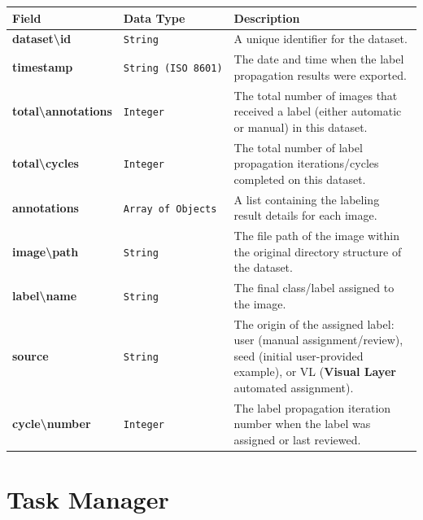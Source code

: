 \documentclass[
  11pt,
  a4paper,
  11pt,
  oneside]{report}
\renewcommand{\toprule}{\hline}
\renewcommand{\midrule}{\hline}
\renewcommand{\bottomrule}{\hline}
\begin{document}
\begin{longtable}[]{@{}
  >{\raggedright\arraybackslash}p{}
  >{\raggedright\arraybackslash}p{}
  >{\raggedright\arraybackslash}p{}@{}}
\toprule\noalign{}
\begin{minipage}[b]{\linewidth}\raggedright
\textbf{Field}
\end{minipage} & \begin{minipage}[b]{\linewidth}\raggedright
\textbf{Data Type}
\end{minipage} & \begin{minipage}[b]{\linewidth}\raggedright
\textbf{Description}
\end{minipage} \\
\midrule\noalign{}
\endhead
\bottomrule\noalign{}
\endlastfoot
\textbf{dataset\textbackslash id} & \texttt{String} & A unique
identifier for the dataset. \\
\textbf{timestamp} & \texttt{String\ (ISO\ 8601)} & The date and time
when the label propagation results were exported. \\
\textbf{total\textbackslash annotations} & \texttt{Integer} & The total
number of images that received a label (either automatic or manual) in
this dataset. \\
\textbf{total\textbackslash cycles} & \texttt{Integer} & The total
number of label propagation iterations/cycles completed on this
dataset. \\
\textbf{annotations} & \texttt{Array\ of\ Objects} & A list containing
the labeling result details for each image. \\
\textbf{image\textbackslash path} & \texttt{String} & The file path of
the image within the original directory structure of the dataset. \\
\textbf{label\textbackslash name} & \texttt{String} & The final
class/label assigned to the image. \\
\textbf{source} & \texttt{String} & The origin of the assigned label:
user (manual assignment/review), seed (initial user-provided example),
or VL (\textbf{Visual Layer} automated assignment). \\
\textbf{cycle\textbackslash number} & \texttt{Integer} & The label
propagation iteration number when the label was assigned or last
reviewed. \\
\end{longtable}

\chapter{Task Manager}\label{task-manager}
\end{document}
